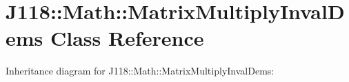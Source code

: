 \hypertarget{class_j118_1_1_math_1_1_matrix_multiply_inval_dems}{}\section{J118\+:\+:Math\+:\+:Matrix\+Multiply\+Inval\+Dems Class Reference}
\label{class_j118_1_1_math_1_1_matrix_multiply_inval_dems}


Inheritance diagram for J118\+:\+:Math\+:\+:Matrix\+Multiply\+Inval\+Dems\+:
